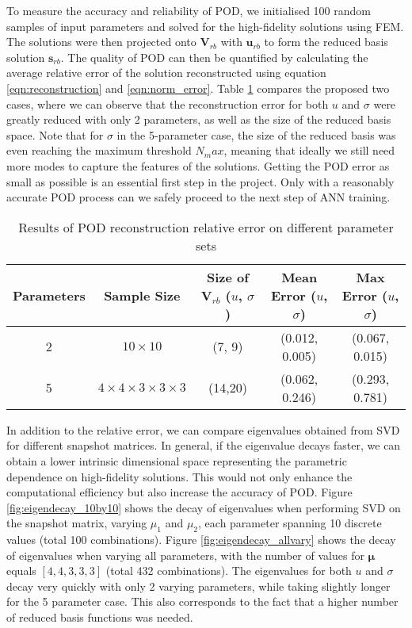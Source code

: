 To measure the accuracy and reliability of POD, we initialised 100 random samples of input parameters and solved for the high-fidelity solutions using FEM. The solutions were then projected onto $\mathbf{V}_{rb}$ with $\mathbf{u}_{rb}$ to form the reduced basis solution $\mathbf{s}_{rb}$. The quality of POD can then be quantified by calculating the average relative error of the solution reconstructed using equation \ref{eqn:reconstruction} and \ref{eqn:norm_error}. Table \ref{tab:POD_results} compares the proposed two cases, where we can observe that the reconstruction error for both $u$ and $\sigma$  were greatly reduced with only 2 parameters, as well as the size of the reduced basis space. Note that for $\sigma$ in the 5-parameter case, the size of the reduced basis was even reaching the maximum threshold $N_max$, meaning that ideally we still need more modes to capture the features of the solutions. Getting the POD error as small as possible is an essential first step in the project. Only with a reasonably accurate POD process can we safely proceed to the next step of ANN training. 

\begin{table}[htb]
    \centering
    \caption{Results of POD reconstruction relative error on different parameter sets}
    \small
    \begin{tabular}{c|c|c|c|c}
        \toprule
        Parameters & Sample Size & Size of $\mathbf{V}_{rb}$ ($u$, $\sigma$) & Mean Error ($u$, $\sigma$) & Max Error ($u$, $\sigma$) \\
        \midrule
        2 & $10 \times 10$ & (7, 9) & (0.012, 0.005) & (0.067, 0.015) \\
        5 & $4 \times 4 \times 3 \times 3 \times 3$ & (14,20) & (0.062, 0.246) & (0.293, 0.781)  \\
        \bottomrule
    \end{tabular}
    \label{tab:POD_results}
\end{table}

In addition to the relative error, we can compare eigenvalues obtained from SVD for different snapshot matrices. In general, if the eigenvalue decays faster, we can obtain a lower intrinsic dimensional space representing the parametric dependence on high-fidelity solutions. This would not only enhance the computational efficiency but also increase the accuracy of POD. Figure \ref{fig:eigendecay_10by10} shows the decay of eigenvalues when performing SVD on the snapshot matrix, varying $\mu_1$ and $\mu_2$, each parameter spanning 10 discrete values (total 100 combinations). Figure \ref{fig:eigendecay_allvary} shows the decay of eigenvalues when varying all parameters, with the number of values for $\bm{\mu}$ equals $[4,4,3,3,3]$ (total 432 combinations). The eigenvalues for both  $u$ and $\sigma$ decay very quickly with only 2 varying parameters, while taking slightly longer for the 5 parameter case. This also corresponds to the fact that a higher number of reduced basis functions was needed.  

